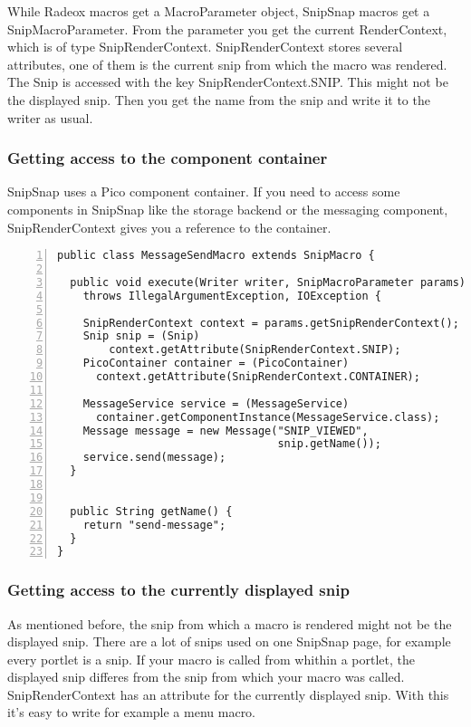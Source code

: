 \documentclass[a4paper,pdftex]{article}
\begin{document}
While Radeox macros get a MacroParameter object, SnipSnap macros get a SnipMacroParameter. From the parameter
you get the current RenderContext, which is of type SnipRenderContext. SnipRenderContext stores several attributes,
one of them is the current snip from which the macro was rendered. The Snip is accessed with the key SnipRenderContext.SNIP.
This might not be the displayed snip. Then you get the name from the snip and write it to the writer as usual.

\subsubsection{Getting access to the component container}

SnipSnap uses a Pico component container\cite{PicoContainer}. If you need
to access some components in SnipSnap like the storage backend or the messaging
component, SnipRenderContext gives you a reference to the container.

\begin{Verbatim}[gobble=0,frame=single,numbers=left,fontsize=\small]
public class MessageSendMacro extends SnipMacro {

  public void execute(Writer writer, SnipMacroParameter params)
    throws IllegalArgumentException, IOException {

    SnipRenderContext context = params.getSnipRenderContext();
    Snip snip = (Snip)
        context.getAttribute(SnipRenderContext.SNIP);
    PicoContainer container = (PicoContainer)
      context.getAttribute(SnipRenderContext.CONTAINER);

    MessageService service = (MessageService)
      container.getComponentInstance(MessageService.class);
    Message message = new Message("SNIP_VIEWED",
                                  snip.getName());
    service.send(message);
  }


  public String getName() {
    return "send-message";
  }
}
\end{Verbatim}

\subsubsection{Getting access to the currently displayed snip}

As mentioned before, the snip from which a macro is rendered might not
be the displayed snip. There are a lot of snips used on one SnipSnap page, 
for example every portlet is a snip. If your macro is called from whithin a
portlet, the displayed snip differes from the snip from which your macro
was called. SnipRenderContext has an attribute for the currently displayed
snip. With this it's easy to write for example a menu macro.
\end{document}
